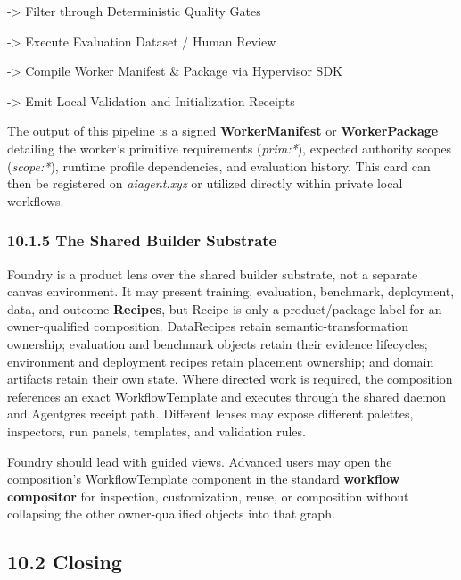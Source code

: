 \documentclass[
  11pt,
]{article}
\begin{document}
-\textgreater{} Filter through Deterministic Quality Gates

-\textgreater{} Execute Evaluation Dataset / Human Review

-\textgreater{} Compile Worker Manifest \& Package via Hypervisor SDK

-\textgreater{} Emit Local Validation and Initialization Receipts

The output of this pipeline is a signed \textbf{WorkerManifest} or
\textbf{WorkerPackage} detailing
the worker's primitive requirements (\emph{prim:*}), expected authority
scopes (\emph{scope:*}), runtime profile dependencies, and evaluation
history. This card can then be registered on \emph{aiagent.xyz} or
utilized directly within private local workflows.

\hypertarget{the-shared-builder-substrate}{%
\subsubsection{10.1.5 The Shared Builder
Substrate}\label{the-shared-builder-substrate}}

Foundry is a product lens over the shared builder substrate, not a
separate canvas environment. It may present training, evaluation, benchmark,
deployment, data, and outcome \textbf{Recipes}, but Recipe is only a
product/package label for an owner-qualified composition. DataRecipes retain
semantic-transformation ownership; evaluation and benchmark objects retain
their evidence lifecycles; environment and deployment recipes retain placement
ownership; and domain artifacts retain their own state. Where directed work is
required, the composition references an exact WorkflowTemplate and executes
through the shared daemon and Agentgres receipt path. Different lenses may
expose different palettes, inspectors, run panels, templates, and validation
rules.

Foundry should lead with guided views. Advanced users may open the composition's
WorkflowTemplate component in the standard \textbf{workflow compositor} for
inspection, customization, reuse, or composition without collapsing the other
owner-qualified objects into that graph.

\hypertarget{closing}{%
\subsection{10.2 Closing}\label{closing}}
\end{document}

